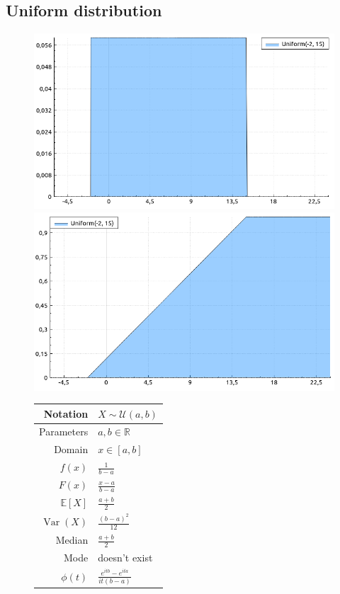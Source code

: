 \documentclass[a4paper,11pt]{article}
\theoremstyle{plain}
\theoremstyle{definition}
\newcommand{\ME}{\mathbb{E}}
\newcommand{\MR}{\mathbb{R}}
\newcommand{\Var}{\operatorname{Var}}
\begin{document}
	\subsection{Uniform distribution}
	\begin{figure}[!htb]\centering
		\begin{minipage}{0.55\textwidth}
			\includegraphics[width=\linewidth, right]{uniform_pdf}
			\captionsetup{labelformat=empty}
			\includegraphics[width=\linewidth, right]{uniform_cdf}
			\captionsetup{labelformat=empty}
		\end{minipage}
		\begin{minipage}{0.4\textwidth}
			\begin{tabular}{| r | l |}
				\hline
				Notation & $ X \sim \mathcal{U}(a, b)$ \\
				\hline
				Parameters & $a, b \in \MR$ \\
				\hline
				Domain & $x \in [a, b]$  \\
				\hline
				$f(x)$ & $\frac{1}{b - a}$ \\
				\hline
				$F(x)$ & $\frac{x - a}{b - a}$\\
				\hline
				$\ME[X]$ & $ \frac{a+b}{2}$ \\
				\hline
				$\Var(X)$ & $\frac{(b-a)^2}{12}$ \\
				\hline
				Median & $\frac{a+b}{2}$ \\
				\hline
				Mode & doesn't exist \\
				\hline
				$\phi(t)$ & $ \frac{e^{itb}-e^{ita}}{it(b-a)} $ \\
				\hline
			\end{tabular}
		\end{minipage}
	\end{figure}
	
\end{document}
